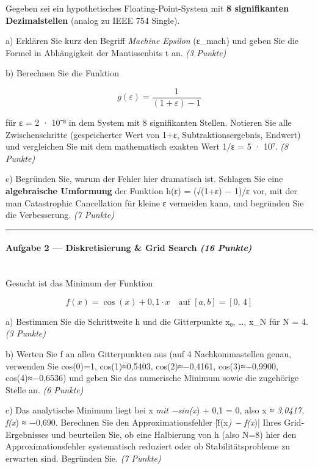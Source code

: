 \documentclass[11pt, a4paper]{article}
\begin{document}
Gegeben sei ein hypothetisches Floating-Point-System mit \textbf{8 signifikanten Dezimalstellen} (analog zu IEEE 754 Single).


a) Erklären Sie kurz den Begriff \textit{Machine Epsilon} (ε\_mach) und geben Sie die Formel in Abhängigkeit der Mantissenbits t an. \textit{(3 Punkte)}


b) Berechnen Sie die Funktion


\[
g(\varepsilon) = \frac{1}{(1+\varepsilon) - 1}
\]


für ε = 2 · 10⁻⁸ in dem System mit 8 signifikanten Stellen. Notieren Sie alle Zwischenschritte (gespeicherter Wert von 1+ε, Subtraktionsergebnis, Endwert) und vergleichen Sie mit dem mathematisch exakten Wert 1/ε = 5 · 10⁷. \textit{(8 Punkte)}


c) Begründen Sie, warum der Fehler hier dramatisch ist. Schlagen Sie eine \textbf{algebraische Umformung} der Funktion h(ε) = (√(1+ε) − 1)/ε vor, mit der man Catastrophic Cancellation für kleine ε vermeiden kann, und begründen Sie die Verbesserung. \textit{(7 Punkte)}



\noindent\textcolor{rulegray}{\rule{\linewidth}{0.4pt}}


\paragraph{Aufgabe 2 — Diskretisierung \& Grid Search \textit{(16 Punkte)}}\mbox{}\\[2pt]

Gesucht ist das Minimum der Funktion


\[
f(x) = \cos(x) + 0{,}1 \cdot x \quad \text{auf } [a,b] = [0,\, 4]
\]


a) Bestimmen Sie die Schrittweite h und die Gitterpunkte x₀, …, x\_N für N = 4. \textit{(3 Punkte)}


b) Werten Sie f an allen Gitterpunkten aus (auf 4 Nachkommastellen genau, verwenden Sie cos(0)=1, cos(1)≈0,5403, cos(2)≈−0,4161, cos(3)≈−0,9900, cos(4)≈−0,6536) und geben Sie das numerische Minimum sowie die zugehörige Stelle an. \textit{(6 Punkte)}


c) Das analytische Minimum liegt bei x\textit{ mit −sin(x}) + 0,1 = 0, also x\textit{ ≈ 3,0417, f(x}) ≈ −0,690. Berechnen Sie den Approximationsfehler |f̃(x\textit{) − f(x})| Ihres Grid-Ergebnisses und beurteilen Sie, ob eine Halbierung von h (also N=8) hier den Approximationsfehler systematisch reduziert oder ob Stabilitätsprobleme zu erwarten sind. Begründen Sie. \textit{(7 Punkte)}
\end{document}
